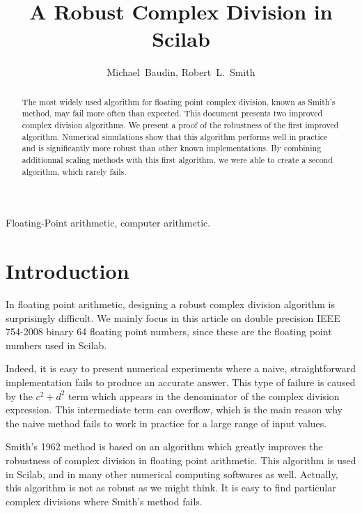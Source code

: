 \documentclass{paper}
\begin{document}
\title{A Robust Complex Division in Scilab}


\author{Michael~Baudin,
        Robert~L.~Smith}

\maketitle


\begin{abstract}
The most widely used algorithm for floating point 
complex division, known as Smith's method, may fail more often than expected. 
This document presents two improved complex 
division algorithms. 
We present a proof of the robustness of the first improved 
algorithm. 
Numerical simulations show that this algorithm performs 
well in practice and is significantly more robust  
than other known implementations. 
By combining additionnal scaling methods with this first 
algorithm, we were able to create a second algorithm, 
which rarely fails.
\end{abstract}

\begin{keywords}
Floating-Point arithmetic, computer arithmetic.
\end{keywords}


\section{Introduction}

In floating point arithmetic, designing a robust complex division 
algorithm is surprisingly difficult. 
We mainly focus in this article on double precision IEEE 754-2008 
binary 64 floating point numbers, since these are the floating point 
numbers used in Scilab.

Indeed, it is easy to present numerical experiments where a 
naive, straightforward implementation fails to produce 
an accurate answer. 
This type of failure is caused by the 
$c^2+d^2$ term which appears in the denominator of 
the complex division expression. 
This intermediate term can overflow, which is the main 
reason why the naive method fails to work in practice for 
a large range of input values. 

Smith's 1962 method \cite{Smith1962} is based on an algorithm which 
greatly improves the robustness of complex  
division in floating point arithmetic. 
This algorithm is used in Scilab, and in many other numerical 
computing softwares as well. 
Actually, this algorithm is not as robust as we might 
think. 
It is easy to find particular complex divisions where 
Smith's method fails. 
\end{document}
